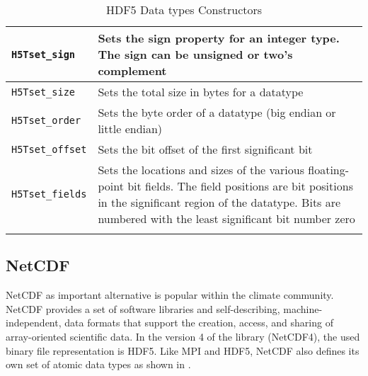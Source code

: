\begin{longtable}{|>{\centering\arraybackslash} m{5.5cm} | >{\centering\arraybackslash} m{6cm} |}
        \small \texttt{H5Tset\_sign}             & \small Sets the sign property for an integer type. The sign can be unsigned or %
                                                   two's complement                                                                    \\ \hline
        \small \texttt{H5Tset\_size}             & \small Sets the total size in bytes for a datatype                                  \\ \hline
        \small \texttt{H5Tset\_order}            & \small Sets the byte order of a datatype (big endian or little endian)              \\ \hline
        \small \texttt{H5Tset\_offset}           & \small Sets the bit offset of the first significant bit                             \\ \hline
        \small \texttt{H5Tset\_fields}           & \small Sets the locations and sizes of the various floating-point bit fields. %
                                                   The field positions are bit positions in the significant region of the datatype. %
                                                   Bits are numbered with the least significant bit number zero                        \\ \hline
        \caption{HDF5 Data types Constructors}
        \label{table: hdf5-constr}
\end{longtable}

\clearpage

\subsection{NetCDF}

NetCDF as important alternative is popular within the climate community. NetCDF provides a set of software libraries and self-describing, machine-independent, data formats that support the creation, access, and sharing of array-oriented scientific data.
In the version 4 of the library (NetCDF4), the used binary file representation is HDF5. Like MPI and HDF5, NetCDF also defines its own set of atomic data types as shown in .


